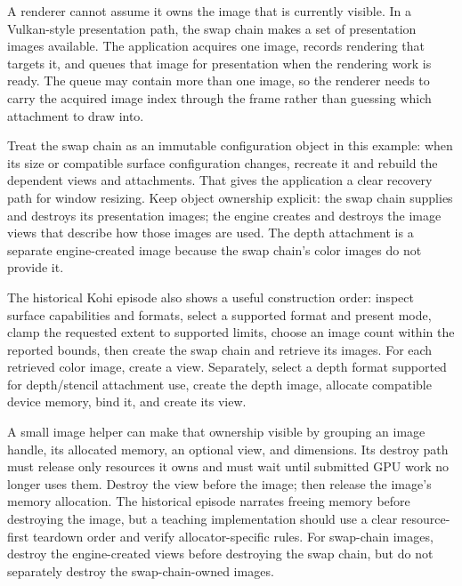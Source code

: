 A renderer cannot assume it owns the image that is currently visible. In a Vulkan-style presentation path, the swap chain makes a set of presentation images available. The application acquires one image, records rendering that targets it, and queues that image for presentation when the rendering work is ready. The queue may contain more than one image, so the renderer needs to carry the acquired image index through the frame rather than guessing which attachment to draw into.

Treat the swap chain as an immutable configuration object in this example: when its size or compatible surface configuration changes, recreate it and rebuild the dependent views and attachments. That gives the application a clear recovery path for window resizing. Keep object ownership explicit: the swap chain supplies and destroys its presentation images; the engine creates and destroys the image views that describe how those images are used. The depth attachment is a separate engine-created image because the swap chain's color images do not provide it.

The historical Kohi episode also shows a useful construction order: inspect surface capabilities and formats, select a supported format and present mode, clamp the requested extent to supported limits, choose an image count within the reported bounds, then create the swap chain and retrieve its images. For each retrieved color image, create a view. Separately, select a depth format supported for depth/stencil attachment use, create the depth image, allocate compatible device memory, bind it, and create its view.

A small image helper can make that ownership visible by grouping an image handle, its allocated memory, an optional view, and dimensions. Its destroy path must release only resources it owns and must wait until submitted GPU work no longer uses them. Destroy the view before the image; then release the image's memory allocation. The historical episode narrates freeing memory before destroying the image, but a teaching implementation should use a clear resource-first teardown order and verify allocator-specific rules. For swap-chain images, destroy the engine-created views before destroying the swap chain, but do not separately destroy the swap-chain-owned images.

